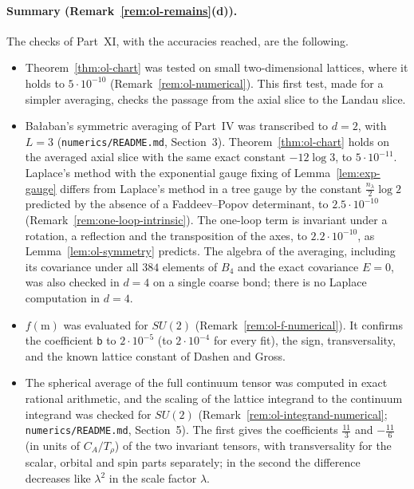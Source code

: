 \paragraph{Summary (Remark~\ref{rem:ol-remains}(d)).} The checks of Part~XI, with the accuracies reached, are the following.
\begin{itemize}
\item Theorem~\ref{thm:ol-chart} was tested on small two-dimensional lattices, where it holds to $5\cdot10^{-10}$ (Remark~\ref{rem:ol-numerical}). This first test, made for a simpler averaging, checks the passage from the axial slice to the Landau slice.
\item Ba\l aban's symmetric averaging of Part~IV was transcribed to $d=2$, with $L=3$ (\texttt{numerics/README.md}, Section~3). Theorem~\ref{thm:ol-chart} holds on the averaged axial slice with the same exact constant $-12\log3$, to $5\cdot10^{-11}$. Laplace's method with the exponential gauge fixing of Lemma~\ref{lem:exp-gauge} differs from Laplace's method in a tree gauge by the constant $\frac{n_\lambda}2\log2$ predicted by the absence of a Faddeev--Popov determinant, to $2.5\cdot10^{-10}$ (Remark~\ref{rem:one-loop-intrinsic}). The one-loop term is invariant under a rotation, a reflection and the transposition of the axes, to $2.2\cdot10^{-10}$, as Lemma~\ref{lem:ol-symmetry} predicts. The algebra of the averaging, including its covariance under all $384$ elements of $B_4$ and the exact covariance $E=0$, was also checked in $d=4$ on a single coarse bond; there is no Laplace computation in $d=4$.
\item $f(\mathrm m)$ was evaluated for $SU(2)$ (Remark~\ref{rem:ol-f-numerical}). It confirms the coefficient $\mathsf b$ to $2\cdot10^{-5}$ (to $2\cdot10^{-4}$ for every fit), the sign, transversality, and the known lattice constant of Dashen and Gross.
\item The spherical average of the full continuum tensor was computed in exact rational arithmetic, and the scaling of the lattice integrand to the continuum integrand was checked for $SU(2)$ (Remark~\ref{rem:ol-integrand-numerical}; \texttt{numerics/README.md}, Section~5). The first gives the coefficients $\frac{11}3$ and $-\frac{11}6$ (in units of $C_A/T_\rho$) of the two invariant tensors, with transversality for the scalar, orbital and spin parts separately; in the second the difference decreases like $\lambda^2$ in the scale factor $\lambda$.
\end{itemize}
